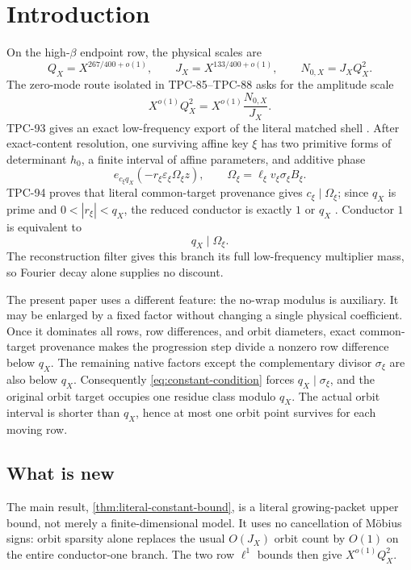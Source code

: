 \section{Introduction}
\label{sec:introduction}

On the high-\(\beta\) endpoint row, the physical scales are
\[
 Q_X=X^{267/400+o(1)},\qquad
 J_X=X^{133/400+o(1)},\qquad
 N_{0,X}=J_XQ_X^2.
\]
The zero-mode route isolated in TPC-85--TPC-88 asks for the
amplitude scale
\begin{equation}
 X^{o(1)}Q_X^2
 =
 X^{o(1)}\frac{N_{0,X}}{J_X}.
\label{eq:target-amplitude}
\end{equation}
TPC-93 gives an exact low-frequency export of the literal matched
shell \citep{WangTPC93}.  After exact-content resolution, one
surviving affine key \(\xi\) has two primitive forms of determinant
\(h_0\), a finite interval of affine parameters, and additive phase
\[
 e_{c_\xi q_X}\!
 \left(-r_\xi\varepsilon_\xi
       \Omega_\xi z\right),
 \qquad
 \Omega_\xi
 =\ell_\xi v_\xi\sigma_\xi B_\xi.
\]
TPC-94 proves that literal common-target provenance gives
\(c_\xi\mid\Omega_\xi\); since \(q_X\) is prime and
\(0<|r_\xi|<q_X\), the reduced conductor is exactly \(1\) or
\(q_X\) \citep{WangTPC94}.  Conductor \(1\) is equivalent to
\begin{equation}
 q_X\mid\Omega_\xi.
\label{eq:constant-condition}
\end{equation}
The reconstruction filter gives this branch its full low-frequency
multiplier mass, so Fourier decay alone supplies no discount.

The present paper uses a different feature: the no-wrap modulus is
auxiliary.  It may be enlarged by a fixed factor without changing a
single physical coefficient.  Once it dominates all rows, row
differences, and orbit diameters, exact common-target provenance
makes the progression step divide a nonzero row difference below
\(q_X\).  The remaining native factors except the complementary
divisor \(\sigma_\xi\) are also below \(q_X\).  Consequently
\eqref{eq:constant-condition} forces \(q_X\mid\sigma_\xi\), and the
original orbit target occupies one residue class modulo \(q_X\).
The actual orbit interval is shorter than \(q_X\), hence at most one
orbit point survives for each moving row.

\subsection{What is new}

The main result, \cref{thm:literal-constant-bound}, is a literal
growing-packet upper bound, not merely a finite-dimensional model.
It uses no cancellation of M\"obius signs: orbit sparsity alone
replaces the usual \(O(J_X)\) orbit count by \(O(1)\) on the entire
conductor-one branch.  The two row \(\ell^1\) bounds then give
\(X^{o(1)}Q_X^2\).


